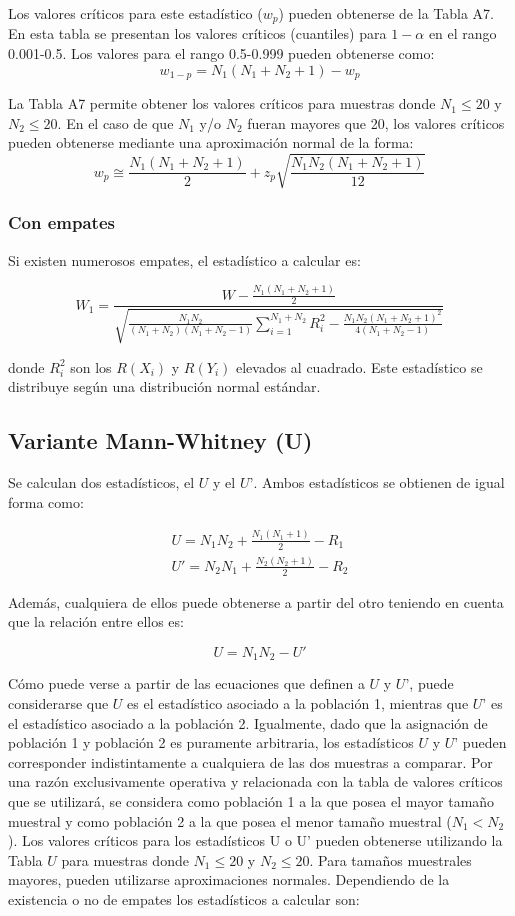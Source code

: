 \documentclass[]{book}
\theoremstyle{definition}
\theoremstyle{definition}
\theoremstyle{definition}
\theoremstyle{remark}
\begin{document}
Los valores críticos para este estadístico (\(w_p\)) pueden obtenerse de
la Tabla A7. En esta tabla se presentan los valores críticos (cuantiles)
para \(1-\alpha\) en el rango 0.001-0.5. Los valores para el rango
0.5-0.999 pueden obtenerse como: \[w_{1-p}=N_1 (N_1+N_2+1)-w_p\]

La Tabla A7 permite obtener los valores críticos para muestras donde
\(N_1\le20\) y \(N_2\le20\). En el caso de que \(N_1\) y/o \(N_2\)
fueran mayores que 20, los valores críticos pueden obtenerse mediante
una aproximación normal de la forma:
\[w_p\cong \frac{N_1 (N_1+N_2+1)}{2}+z_p \sqrt{\frac{N_1 N_2 (N_1+N_2+1)}{12}}\]

\hypertarget{w-con-empates}{%
\subsubsection{Con empates}\label{w-con-empates}}

Si existen numerosos empates, el estadístico a calcular es:

\[
W_1=\frac{W-\frac{N_1(N_1+N_2+1)}{2}}{\sqrt{\frac{N_1 N_2}{(N_1+N_2)(N_1+N_2-1)}\sum_{i=1}^{N_1+N_2}{R_i^2}-\frac{N_1 N_2 (N_1+N_2+1)^2}{4(N_1+N_2-1)}}}
\]

donde \(R_i^2\) son los \(R(X_i)\) y \(R(Y_i)\) elevados al cuadrado.
Este estadístico se distribuye según una distribución normal estándar.

\hypertarget{variante-mann-whitney-u}{%
\subsection{Variante Mann-Whitney (U)}\label{variante-mann-whitney-u}}

Se calculan dos estadísticos, el \(U\) y el \(U’\). Ambos estadísticos
se obtienen de igual forma como:

\[
\begin{matrix}
U = N_1 N_2+\frac{N_1 (N_1+1)}{2}-R_1 \\
U'=N_2 N_1+\frac{N_2 (N_2+1)}{2}-R_2
\end{matrix}
\]

Además, cualquiera de ellos puede obtenerse a partir del otro teniendo
en cuenta que la relación entre ellos es:

\[U=N_1 N_2-U'\]

Cómo puede verse a partir de las ecuaciones que definen a \(U\) y
\(U’\), puede considerarse que \(U\) es el estadístico asociado a la
población 1, mientras que \(U’\) es el estadístico asociado a la
población 2. Igualmente, dado que la asignación de población 1 y
población 2 es puramente arbitraria, los estadísticos \(U\) y \(U’\)
pueden corresponder indistintamente a cualquiera de las dos muestras a
comparar. Por una razón exclusivamente operativa y relacionada con la
tabla de valores críticos que se utilizará, se considera como población
1 a la que posea el mayor tamaño muestral y como población 2 a la que
posea el menor tamaño muestral (\(N_1 < N_2\)). Los valores críticos
para los estadísticos U o U' pueden obtenerse utilizando la Tabla \(U\)
para muestras donde \(N_1\le 20\) y \(N_2\le 20\). Para tamaños
muestrales mayores, pueden utilizarse aproximaciones normales.
Dependiendo de la existencia o no de empates los estadísticos a calcular
son:
\end{document}
